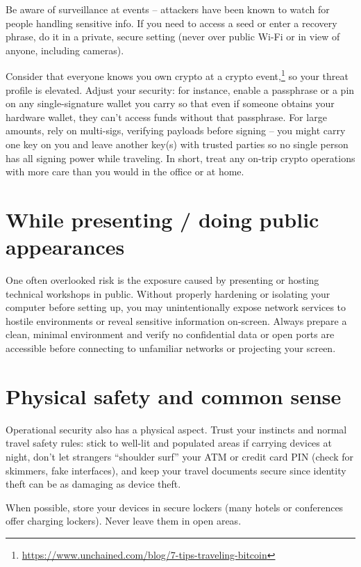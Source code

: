 Be aware of surveillance at events -- attackers have been
known to watch for people handling sensitive info. If you
need to access a seed or enter a recovery phrase, do it in
a private, secure setting (never over public Wi-Fi or in
view of anyone, including cameras).

Consider that everyone knows you own crypto at a crypto
event,\footnote{\url{https://www.unchained.com/blog/7-tips-traveling-bitcoin}}
so your threat profile is elevated. Adjust your security:
for instance, enable a passphrase or a pin on any
single-signature wallet you carry so that even if someone
obtains your hardware wallet, they can't access funds
without that passphrase. For large amounts, rely on
multi-sigs, verifying payloads before signing -- you might
carry one key on you and leave another key(s) with trusted
parties so no single person has all signing power while
traveling. In short, treat any on-trip crypto operations
with more care than you would in the office or at home.

\section{While presenting / doing public appearances}

One often overlooked risk is the exposure caused by
presenting or hosting technical workshops in public.
Without properly hardening or isolating your computer
before setting up, you may unintentionally expose network
services to hostile environments or reveal sensitive
information on-screen. Always prepare a clean, minimal
environment and verify no confidential data or open ports
are accessible before connecting to unfamiliar networks or
projecting your screen.

\section{Physical safety and common sense}

Operational security also has a physical aspect. Trust
your instincts and normal travel safety rules: stick to
well-lit and populated areas if carrying devices at night,
don't let strangers ``shoulder surf'' your ATM or credit
card PIN (check for skimmers, fake interfaces), and keep
your travel documents secure since identity theft can be
as damaging as device theft.

When possible, store your devices in secure lockers (many
hotels or conferences offer charging lockers). Never leave
them in open areas.

